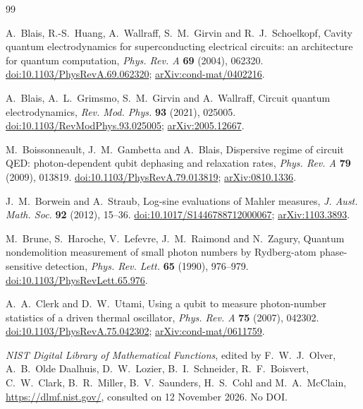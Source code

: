 \documentclass[11pt,reqno]{amsart}
\numberwithin{equation}{section}
\theoremstyle{plain}
\theoremstyle{definition}
\theoremstyle{remark}
\begin{document}
\begin{thebibliography}{99}

A.~Blais, R.-S.~Huang, A.~Wallraff, S.~M.~Girvin and R.~J.~Schoelkopf, Cavity quantum electrodynamics for superconducting electrical circuits: an architecture for quantum computation, \emph{Phys. Rev. A} \textbf{69} (2004), 062320.
\href{https://doi.org/10.1103/PhysRevA.69.062320}{doi:10.1103/PhysRevA.69.062320};
\href{https://arxiv.org/abs/cond-mat/0402216}{arXiv:cond-mat/0402216}.

A.~Blais, A.~L.~Grimsmo, S.~M.~Girvin and A.~Wallraff, Circuit quantum electrodynamics, \emph{Rev. Mod. Phys.} \textbf{93} (2021), 025005.
\href{https://doi.org/10.1103/RevModPhys.93.025005}{doi:10.1103/RevModPhys.93.025005};
\href{https://arxiv.org/abs/2005.12667}{arXiv:2005.12667}.

M.~Boissonneault, J.~M.~Gambetta and A.~Blais, Dispersive regime of circuit QED: photon-dependent qubit dephasing and relaxation rates, \emph{Phys. Rev. A} \textbf{79} (2009), 013819.
\href{https://doi.org/10.1103/PhysRevA.79.013819}{doi:10.1103/PhysRevA.79.013819};
\href{https://arxiv.org/abs/0810.1336}{arXiv:0810.1336}.

J.~M.~Borwein and A.~Straub, Log-sine evaluations of Mahler measures, \emph{J. Aust. Math. Soc.} \textbf{92} (2012), 15--36.
\href{https://doi.org/10.1017/S1446788712000067}{doi:10.1017/S1446788712000067};
\href{https://arxiv.org/abs/1103.3893}{arXiv:1103.3893}.

M.~Brune, S.~Haroche, V.~Lefevre, J.~M.~Raimond and N.~Zagury, Quantum nondemolition measurement of small photon numbers by Rydberg-atom phase-sensitive detection, \emph{Phys. Rev. Lett.} \textbf{65} (1990), 976--979.
\href{https://doi.org/10.1103/PhysRevLett.65.976}{doi:10.1103/PhysRevLett.65.976}.

A.~A.~Clerk and D.~W.~Utami, Using a qubit to measure photon-number statistics of a driven thermal oscillator, \emph{Phys. Rev. A} \textbf{75} (2007), 042302.
\href{https://doi.org/10.1103/PhysRevA.75.042302}{doi:10.1103/PhysRevA.75.042302};
\href{https://arxiv.org/abs/cond-mat/0611759}{arXiv:cond-mat/0611759}.

\emph{NIST Digital Library of Mathematical Functions}, edited by F.~W.~J.~Olver, A.~B.~Olde Daalhuis, D.~W.~Lozier, B.~I.~Schneider, R.~F.~Boisvert, C.~W.~Clark, B.~R.~Miller, B.~V.~Saunders, H.~S.~Cohl and M.~A.~McClain,
\href{https://dlmf.nist.gov/}{https://dlmf.nist.gov/}, consulted on 12 November 2026. No DOI.


\end{thebibliography}
\end{document}
